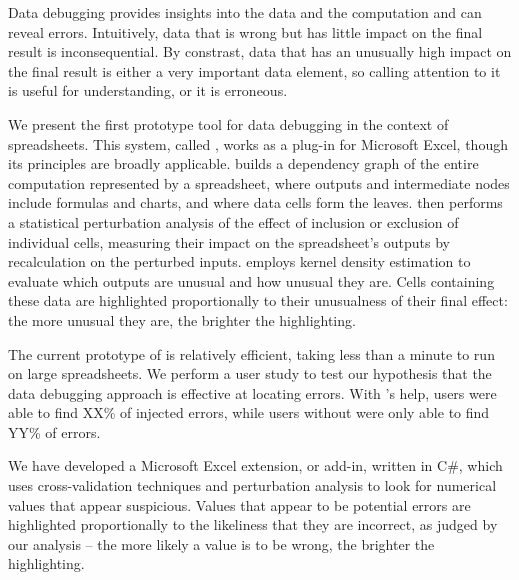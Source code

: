Data debugging provides insights into the data and the computation and
can reveal errors. Intuitively, data that is wrong but has little
impact on the final result is inconsequential. By constrast, data that
has an unusually high impact on the final result is either a very
important data element, so calling attention to it is useful for
understanding, or it is erroneous.

We present the first prototype tool for data debugging in the context
of spreadsheets.  This system, called \checkcell{}, works as a plug-in
for Microsoft Excel, though its principles are broadly
applicable. \checkcell{} builds a dependency graph of the entire
computation represented by a spreadsheet, where outputs and
intermediate nodes include formulas and charts, and where data cells
form the leaves. \checkcell{} then performs a statistical perturbation
analysis of the effect of inclusion or exclusion of individual cells,
measuring their impact on the spreadsheet's outputs by recalculation
on the perturbed inputs. \checkcell{} employs kernel density
estimation to evaluate which outputs are unusual and how unusual they
are.  Cells containing these data are highlighted proportionally to
their unusualness of their final effect: the more unusual they are,
the brighter the highlighting.

The current prototype of \checkcell{} is relatively efficient, taking
less than a minute to run on large spreadsheets. We perform a user
study to test our hypothesis that the data debugging approach is
effective at locating errors. With \checkcell{}'s help, users were
able to find XX\% of injected errors, while users without \checkcell{}
were only able to find YY\% of errors.

We have developed a Microsoft Excel extension, or add-in, written in
C\#, which uses cross-validation techniques and perturbation analysis
to look for numerical values that appear suspicious.  Values that
appear to be potential errors are highlighted proportionally to the
likeliness that they are incorrect, as judged by our analysis -- the
more likely a value is to be wrong, the brighter the highlighting.
